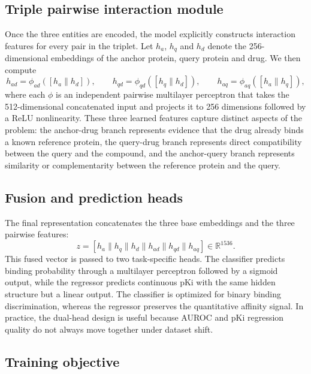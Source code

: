 \subsection{Triple pairwise interaction module}

Once the three entities are encoded, the model explicitly constructs interaction features for every pair in the triplet. Let $h_a$, $h_q$ and $h_d$ denote the 256-dimensional embeddings of the anchor protein, query protein and drug. We then compute
\[
h_{ad} = \phi_{ad}([h_a \| h_d]), \qquad
h_{qd} = \phi_{qd}([h_q \| h_d]), \qquad
h_{aq} = \phi_{aq}([h_a \| h_q]),
\]
where each $\phi$ is an independent pairwise multilayer perceptron that takes the 512-dimensional concatenated input and projects it to 256 dimensions followed by a ReLU nonlinearity. These three learned features capture distinct aspects of the problem: the anchor-drug branch represents evidence that the drug already binds a known reference protein, the query-drug branch represents direct compatibility between the query and the compound, and the anchor-query branch represents similarity or complementarity between the reference protein and the query.

\subsection{Fusion and prediction heads}

The final representation concatenates the three base embeddings and the three pairwise features:
\[
z = [h_a \| h_q \| h_d \| h_{ad} \| h_{qd} \| h_{aq}] \in \mathbb{R}^{1536}.
\]
This fused vector is passed to two task-specific heads. The classifier predicts binding probability through a multilayer perceptron followed by a sigmoid output, while the regressor predicts continuous pKi with the same hidden structure but a linear output. The classifier is optimized for binary binding discrimination, whereas the regressor preserves the quantitative affinity signal. In practice, the dual-head design is useful because AUROC and pKi regression quality do not always move together under dataset shift.

\subsection{Training objective}

